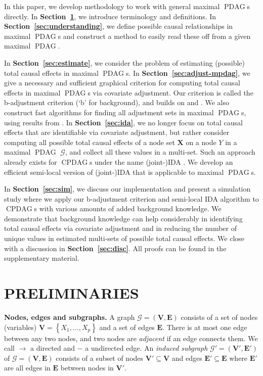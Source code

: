 \documentclass[letterpaper]{article}
\theoremstyle{definition}
\theoremstyle{remark}
\DeclareMathOperator{\PDAG}{PDAG}
\DeclareMathOperator{\CPDAG}{CPDAG}
\newcommand{\mpdag}{maximal $\PDAG$}
\newcommand{\vars}[1][V]{\mathbf{#1}}
\newcommand{\e}[1][E]{\mathbf{#1}}
\newcommand{\g}[1][G]{\mathcal{#1}}
\begin{document}
In this paper, we develop methodology to work with general \mpdag{}s directly.
In \textbf{Section~\ref{sec:prelim}}, we introduce terminology and definitions. In \textbf{Section~\ref{sec:understanding}}, we define possible causal relationships in \mpdag{}s and construct a method to easily read these off from a given \mpdag{}.

In \textbf{Section~\ref{sec:estimate}}, we consider the problem of estimating (possible) total causal effects in \mpdag{}s.
In \textbf{Section~\ref{sec:adjust-mpdag}}, we give a necessary and sufficient graphical criterion for computing total causal effects in \mpdag{}s via covariate adjustment. Our criterion is called the b-adjustment criterion (`b' for background), and builds on \cite{shpitser2012validity,shpitser2012avalidity} and \cite{perkovic15_uai,perkovic16}. We also construct fast algorithms for finding all adjustment sets in \mpdag{}s, using results from \cite{vanconstructing}.
In \textbf{Section~\ref{sec:ida}}, we no longer focus on total causal effects that are identifiable via covariate adjustment, but rather consider computing all possible total causal effects of a node set $\mathbf{X}$ on a node $Y$ in a \mpdag{} $\g$, and collect all these values in a multi-set. Such an approach already exists for $\CPDAG$s under the name (joint-)IDA \citep{MaathuisKalischBuehlmann09,MaathuisColomboKalischBuehlmann10,nandy2014estimating}.  
We develop an efficient semi-local version of (joint-)IDA that is applicable to \mpdag{}s.

In \textbf{Section~\ref{sec:sim}}, we discuss our implementation and present a simulation study where we apply our b-adjustment criterion and semi-local IDA algorithm to $\CPDAG$s with various amounts of added background knowledge. We demonstrate that background knowledge can help considerably in identifying total causal effects via covariate adjustment and in reducing the number of unique values in estimated multi-sets of possible total causal effects. We close with a discussion in \textbf{Section~\ref{sec:disc}}. All proofs can be found in the supplementary material.

\section{PRELIMINARIES} \label{sec:prelim}

\textbf{Nodes, edges and subgraphs.} A graph $\g= (\vars,\e) $ consists of a set of nodes (variables) $ \vars=\left\lbrace X_{1},\dots,X_{p}\right\rbrace$ and a set of edges $ \e $. There is at most one edge between any two nodes, and two nodes are \textit{adjacent} if an edge connects them. 
We call $\rightarrow$ a directed and $-$ a undirected edge. An \textit{induced subgraph} $\g' =(\mathbf{V'}, \mathbf{E'})$ of $\g= (\vars,\e) $ consists of a subset of nodes $\mathbf{V'} \subseteq \mathbf{V}$ and edges $\mathbf{E'} \subseteq \mathbf{E}$ where $\mathbf{E'}$ are all edges in $\mathbf{E}$ between nodes in $\mathbf{V'}$.
\end{document}
